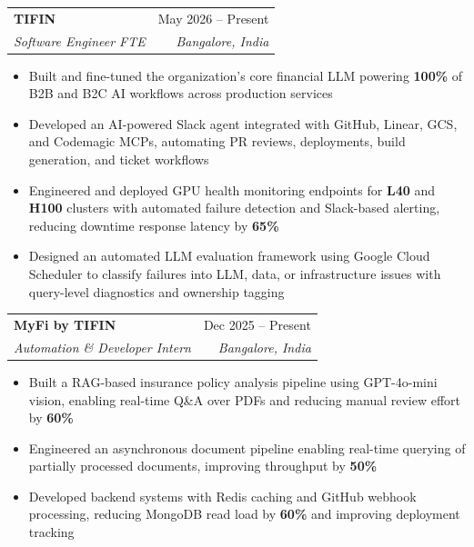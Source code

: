 \documentclass[letterpaper,11pt]{article}
\makeatletter
\newcommand{\resumeItem}[1]{
  \item\small{
    {#1 \vspace{-2pt}}
  }
}
\newcommand{\resumeSubheading}[4]{
  \vspace{-2pt}\item
    \begin{tabular*}{0.97\textwidth}[t]{l@{\extracolsep{\fill}}r}
      \textbf{#1} & #2 \\
      \textit{\small#3} & \textit{\small #4} \\
    \end{tabular*}\vspace{-7pt}
}
\newcommand{\resumeSubSubheading}[2]{
    \item
    \begin{tabular*}{0.97\textwidth}{l@{\extracolsep{\fill}}r}
      \textit{\small#1} & \textit{\small #2} \\
    \end{tabular*}\vspace{-7pt}
}
\newcommand{\resumeSubHeadingListEnd}{\end{itemize}}
\newcommand{\resumeItemListStart}{\begin{itemize}[leftmargin=*,itemsep=1pt,parsep=1pt]}
\newcommand{\resumeItemListEnd}{\end{itemize}\vspace{-8pt}}
\makeatother
\begin{document}
\resumeSubheading
      {TIFIN}{May 2026 -- Present}
      {Software Engineer FTE}{Bangalore, India}
      \resumeItemListStart
        \resumeItem{Built and fine-tuned the organization’s core financial LLM powering \textbf{100\%} of B2B and B2C AI workflows across production services}
        
        \resumeItem{Developed an AI-powered Slack agent integrated with GitHub, Linear, GCS, and Codemagic MCPs, automating PR reviews, deployments, build generation, and ticket workflows}
        
        \resumeItem{Engineered and deployed GPU health monitoring endpoints for \textbf{L40} and \textbf{H100} clusters with automated failure detection and Slack-based alerting, reducing downtime response latency by \textbf{65\%}}
        
        \resumeItem{Designed an automated LLM evaluation framework using Google Cloud Scheduler to classify failures into LLM, data, or infrastructure issues with query-level diagnostics and ownership tagging}
      \resumeItemListEnd
      
\resumeSubheading
      {MyFi by TIFIN}{Dec 2025 -- Present}
      {Automation \& Developer Intern}{Bangalore, India}
      \resumeItemListStart
        \resumeItem{Built a RAG-based insurance policy analysis pipeline using GPT-4o-mini vision, enabling real-time Q\&A over PDFs and reducing manual review effort by \textbf{60\%}}
        \resumeItem{Engineered an asynchronous document pipeline enabling real-time querying of partially processed documents, improving throughput by \textbf{50\%}}
        \resumeItem{Developed backend systems with Redis caching and GitHub webhook processing, reducing MongoDB read load by \textbf{60\%} and improving deployment tracking}
      \resumeItemListEnd
\end{document}
